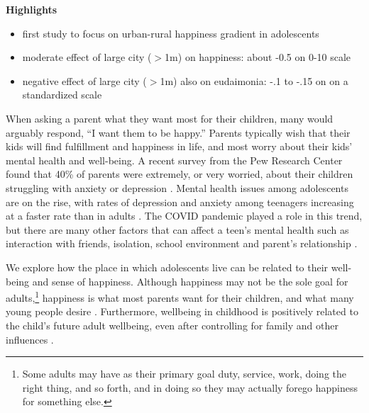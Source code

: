 \documentclass[10pt, letterpaper]{article}
\newcommand{\emd}[1]{\ExecuteMetaData[/tmp/tex]{#1}} %
\begin{document}
\begin{spacing}{1.4} %

\textbf{Highlights}

\begin{itemize}
\item first study to focus on urban-rural happiness gradient in adolescents
\item moderate effect  of large city ($>$1m) on happiness: about -0.5 on
  0-10 scale
\item negative effect  of large city ($>$1m) also on eudaimonia: -.1 to -.15 on %
 on a standardized scale
\end{itemize}





\noindent 

When asking a parent what they want most for their children, many would arguably
respond, ``I want them to be happy.'' Parents typically wish that their kids
will find fulfillment and happiness in life, and most worry about their kids'
mental health and well-being. A recent survey from the Pew Research Center found
that 40\% of parents were extremely, or very worried, about their children
struggling with anxiety or depression \citep{pew}. Mental health issues among
adolescents are on the rise, with rates of depression and anxiety among
teenagers increasing at a faster rate than in adults \citep{cdc}. The COVID
pandemic  played a role in this trend, but there are many other factors that can
affect a teen's mental health such as interaction with friends, isolation,
school environment and parent's relationship \citep{twenge12,twenge14,twenge15,twengeATL17sep}. 

We explore how the place in which adolescents live can be related to their
well-being and sense of happiness. Although happiness may not be the sole goal
for adults,\footnote{Some adults may have as their primary goal duty, service, work, doing the
  right thing, and so forth, and in doing so they may actually forego happiness
  for something else.} happiness is what most parents want for their children, and what many young people desire \citep{humphrey2023}. Furthermore, wellbeing in childhood is positively related to the child's future adult
 wellbeing, even after controlling for family and other influences
 \citep{de2012estimating}. 
 


\end{spacing}
\end{document}
